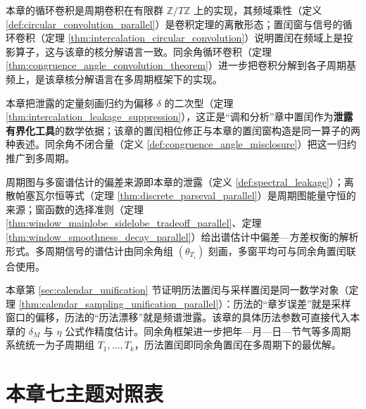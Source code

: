 \begin{remark}\label{rem:interface_series_convolution_parallel}
本章的循环卷积是周期卷积在有限群 $\mathbb{Z}/T\mathbb{Z}$ 上的实现，其频域乘性（定义 \ref{def:circular_convolution_parallel}）是卷积定理的离散形态；置闰窗与信号的循环卷积（定理 \ref{thm:intercalation_circular_convolution}）说明置闰在频域上是投影算子，这与该章的核分解语言一致。同余角循环卷积（定理 \ref{thm:congruence_angle_convolution_theorem}）进一步把卷积分解到各子周期基频上，是该章核分解语言在多周期框架下的实现。
\end{remark}

\begin{remark}\label{rem:interface_harmonic_analysis_parallel}
本章把泄露的定量刻画归约为偏移 $\delta$ 的二次型（定理 \ref{thm:intercalation_leakage_suppression}），这正是“调和分析”章中置闰作为\textbf{泄露有界化工具}的数学依据；该章的置闰相位修正与本章的置闰窗构造是同一算子的两种表述。同余角不闭合量（定义 \ref{def:congruence_angle_misclosure}）把这一归约推广到多周期。
\end{remark}

\begin{remark}\label{rem:interface_time_series_parallel}
周期图与多窗谱估计的偏差来源即本章的泄露（定义 \ref{def:spectral_leakage}）；离散帕塞瓦尔恒等式（定理 \ref{thm:discrete_parseval_parallel}）是周期图能量守恒的来源；窗函数的选择准则（定理 \ref{thm:window_mainlobe_sidelobe_tradeoff_parallel}、定理 \ref{thm:window_smoothness_decay_parallel}）给出谱估计中偏差—方差权衡的解析形式。多周期信号的谱估计由同余角组 $(\theta_{T_i})$ 刻画，多窗平均可与同余角置闰联合使用。
\end{remark}

\begin{remark}\label{rem:interface_calendar_parallel}
本章第 \ref{sec:calendar_unification} 节证明历法置闰与采样置闰是同一数学对象（定理 \ref{thm:calendar_sampling_unification_parallel}）：历法的“章岁误差”就是采样窗口的偏移，历法的“历法漂移”就是频谱泄露。该章的具体历法参数可直接代入本章的 $\delta_M$ 与 $\eta$ 公式作精度估计。同余角框架进一步把年—月—日—节气等多周期系统统一为子周期组 $T_1,\dots,T_k$，历法置闰即同余角置闰在多周期下的最优解。
\end{remark}

\section*{本章七主题对照表}

